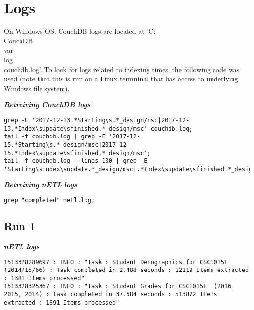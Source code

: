\section{Logs}
On Windows OS, CouchDB logs are located at 'C:\\CouchDB\\var\\log\\couchdb.log'. To look for logs related to indexing times, the following code was used (note that this is run on a Linux termninal that has access to underlying Windows file system).

\textit{\textbf{Retreiving CouchDB logs}}
\begin{verbatim}
grep -E '2017-12-13.*Starting\s.*_design/msc|2017-12-13.*Index\supdate\sfinished.*_design/msc' couchdb.log;
tail -f couchdb.log | grep -E '2017-12-15.*Starting\s.*_design/msc|2017-12-15.*Index\supdate\sfinished.*_design/msc';
tail -f couchdb.log --lines 100 | grep -E 'Starting\sindex\supdate.*_design/msc|.*Index\supdate\sfinished.*_design/msc'
\end{verbatim}

\textit{\textbf{Retreiving nETL logs}}
\begin{verbatim}
grep "completed" netl.log;
\end{verbatim}


\subsection{Run 1}
\textit{\textbf{nETL logs}}
\begin{verbatim}
1513328289697 : INFO : "Task : Student Demographics for CSC1015F (2014/15/66) : Task completed in 2.488 seconds : 12219 Items extracted : 1381 Items processed"
1513328325367 : INFO : "Task : Student Grades for CSC1015F  (2016, 2015, 2014) : Task completed in 37.684 seconds : 513872 Items extracted : 1891 Items processed"
\end{verbatim}

